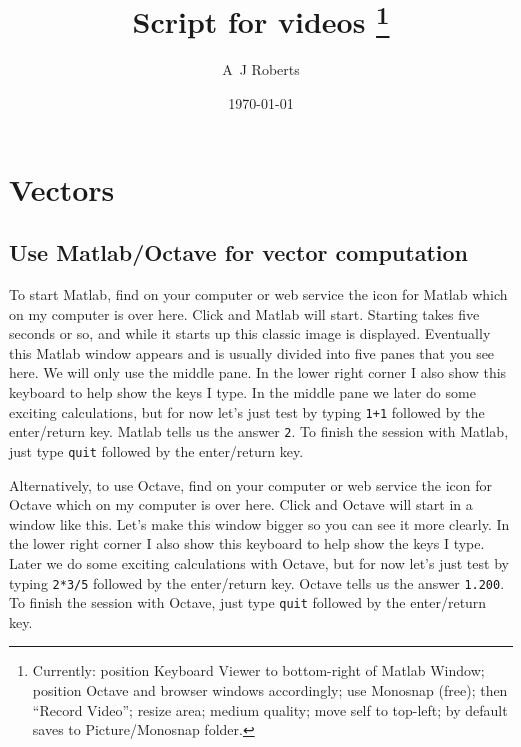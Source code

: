 \documentclass[12pt,a5paper,smallborder,twoside]{refrep}
\title{Script for videos
\footnote{Currently: position Keyboard Viewer to bottom-right of Matlab Window; position Octave and browser windows accordingly; use Monosnap (free); then ``Record Video''; resize area; medium quality; move self to top-left; by default saves to Picture\slash Monosnap folder.}}
\author{A~J Roberts}
\date{\today}
\begin{document}
\sloppy

\maketitle
\tableofcontents


\chapter{Vectors}

\begin{description}

\section{Use Matlab/Octave for vector computation}

\item[startQuit]
To start Matlab, find on your computer or web service the icon for Matlab which on my computer is over here.  
Click and Matlab will start.  
Starting takes five seconds or so, and while it starts up this classic image is displayed.  
Eventually this Matlab window appears and is usually divided into five panes that you see here.  
We will only use the middle pane.  
In the lower right corner I also show this keyboard to help show the keys I type.  
In the middle pane we later do some exciting calculations, but for now let's just test by typing \verb|1+1| followed by the enter\slash return key.  
Matlab tells us the answer \verb|2|.  
To finish the session with Matlab, just type \verb|quit| followed by the enter\slash return key.  

Alternatively, to use Octave, find on your computer or web service the icon for Octave which on my computer is over here.  
Click and Octave will start in a window like this.  
Let's make this window bigger so you can see it more clearly.
In the lower right corner I also show this keyboard to help show the keys I type.  
Later we do some exciting calculations with Octave, but for now let's just test by typing \verb|2*3/5| followed by the enter\slash return key.  
Octave tells us the answer \verb|1.200|.  
To finish the session with Octave, just type \verb|quit| followed by the enter\slash return key.  


\end{description}
\end{document}
